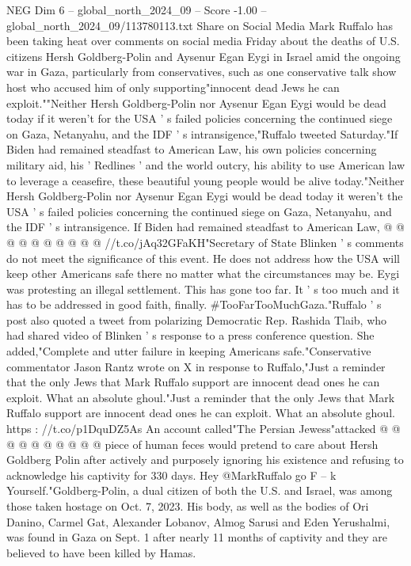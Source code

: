 \begin{textsample}{NEG Dim 6 – global\_north\_2024\_09 – Score -1.00 – global\_north\_2024\_09/113780113.txt}  \label{ex:f6_neg_088}
Share on Social Media Mark Ruffalo has been taking heat over comments on social media Friday about the deaths of U.S. citizens Hersh Goldberg-Polin and Aysenur Egan Eygi in Israel amid the ongoing war in Gaza, particularly from conservatives, such as one conservative talk show host who accused him of only supporting"innocent dead Jews he can exploit.""Neither Hersh Goldberg-Polin nor Aysenur Egan Eygi would be dead today if it weren't for the USA ' s failed policies concerning the continued siege on Gaza, Netanyahu, and the IDF ' s intransigence,"Ruffalo tweeted Saturday."If Biden had remained steadfast to American Law, his own policies concerning military aid, his ' Redlines ' and the world outcry, his ability to use American law to leverage a ceasefire, these beautiful young people would be alive today."Neither Hersh Goldberg-Polin nor Aysenur Egan Eygi would be dead today it weren't the USA ' s failed policies concerning the continued siege on Gaza, Netanyahu, and the IDF ' s intransigence.
If Biden had remained steadfast to American Law, @ @ @ @ @ @ @ @ @ @ //t.co/jAq32GFaKH"Secretary of State Blinken ' s comments do not meet the significance of this event.
He does not address how the USA will keep other Americans safe there no matter what the circumstances may be.
Eygi was protesting an illegal settlement.
This has gone too far.
It ' s too much and it has to be addressed in good faith, finally. \#TooFarTooMuchGaza."Ruffalo ' s post also quoted a tweet from polarizing Democratic Rep.
Rashida Tlaib, who had shared video of Blinken ' s response to a press conference question.
She added,"Complete and utter failure in keeping Americans safe."Conservative commentator Jason Rantz wrote on X in response to Ruffalo,"Just a reminder that the only Jews that Mark Ruffalo support are innocent dead ones he can exploit.
What an absolute ghoul."Just a reminder that the only Jews that Mark Ruffalo support are innocent dead ones he can exploit.
What an absolute ghoul. https : //t.co/p1DquDZ5As An account called"The Persian Jewess"attacked @ @ @ @ @ @ @ @ @ @ piece of human feces would pretend to care about Hersh Goldberg Polin after actively and purposely ignoring his existence and refusing to acknowledge his captivity for 330 days.
Hey @MarkRuffalo go F -- k Yourself."Goldberg-Polin, a dual citizen of both the U.S. and Israel, was among those taken hostage on Oct. 7, 2023.
His body, as well as the bodies of Ori Danino, Carmel Gat, Alexander Lobanov, Almog Sarusi and Eden Yerushalmi, was found in Gaza on Sept. 1 after nearly 11 months of captivity and they are believed to have been killed by Hamas.

\end{textsample}
